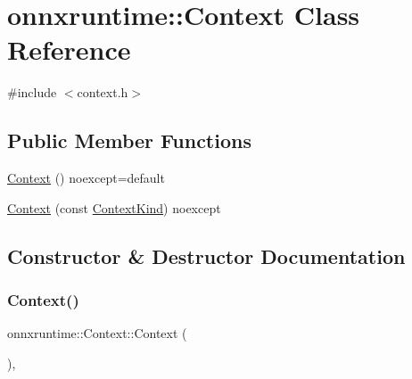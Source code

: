 \hypertarget{classonnxruntime_1_1Context}{}\section{onnxruntime\+:\+:Context Class Reference}
\label{classonnxruntime_1_1Context}


{\ttfamily \#include $<$context.\+h$>$}

\subsection*{Public Member Functions}
\begin{DoxyCompactItemize}
\item 
\mbox{\hyperlink{classonnxruntime_1_1Context_a92b05a3eb48c5dad3acc039ee962cfeb}{Context}} () noexcept=default
\item 
\mbox{\hyperlink{classonnxruntime_1_1Context_adc44d4f82e5416d8dd5809c4f8a59f23}{Context}} (const \mbox{\hyperlink{namespaceonnxruntime_ac95cfa5c0a456b3e7c88aa53eb073ee8}{Context\+Kind}}) noexcept
\end{DoxyCompactItemize}


\subsection{Constructor \& Destructor Documentation}
\mbox{\label{classonnxruntime_1_1Context_a92b05a3eb48c5dad3acc039ee962cfeb}} 
\subsubsection{\texorpdfstring{Context()}{Context()}\hspace{0.1cm}{\footnotesize\ttfamily [1/2]}}
{\footnotesize\ttfamily onnxruntime\+::\+Context\+::\+Context (\begin{DoxyParamCaption}{ }\end{DoxyParamCaption})\hspace{0.3cm}{\ttfamily [default]}, {\ttfamily [noexcept]}}

\mbox{\label{classonnxruntime_1_1Context_adc44d4f82e5416d8dd5809c4f8a59f23}} 
